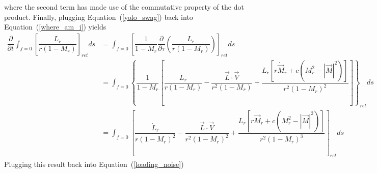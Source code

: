 \documentclass[onecolumn,10pt]{jhwhw}
\begin{document}
where the second term has made use of the commutative property of the dot product. Finally, plugging Equation~(\ref{yolo_swag}) back into Equation~(\ref{where_am_i}) yields
\begin{align*}
\dfrac{\partial}{\partial t} \int_{f=0} \left[ \dfrac{L_r}{r (1 - M_r)} \right]_{ret} ds
&= \int_{f=0} \left[
    \dfrac{1}{1 - M_r} \dfrac{\partial}{\partial \tau}
    \left( \dfrac{L_r}{r   (1 - M_r)}  \right)
    \right]_{ret} ds \\
&= \int_{f=0} \left\{
    \dfrac{1}{1 - M_r} \left[
    \dfrac{\dot{L}_r}{r (1 - M_r)}
    - \dfrac{\vec{L}\cdot\vec{V}}{r^2 (1 - M_r)}
    + \dfrac{ L_r \left[
        r\dot{\vec{M}}_r + c \left( M_r^2 - |\vec{M}|^2 \right) \right] }
        {r^2 (1 - M_r)^2} \right]
    \right\}_{ret} ds \\
&= \int_{f=0} \left[
    \dfrac{\dot{L}_r}{r (1 - M_r)^2}
    - \dfrac{\vec{L}\cdot\vec{V}}{r^2 (1 - M_r)^2}
    + \dfrac{ L_r \left[
        r\dot{\vec{M}}_r + c \left( M_r^2 - |\vec{M}|^2 \right) \right] }
        {r^2 (1 - M_r)^3}
    \right]_{ret} ds
\end{align*}
Plugging this result back into Equation~(\ref{loading_noise})
\end{document}
